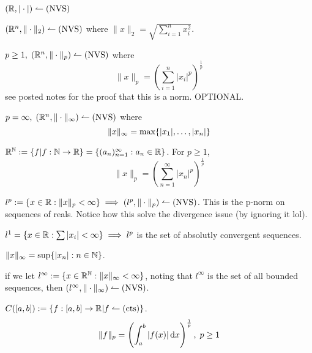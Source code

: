 \documentclass[12pt]{article}
\begin{document}
\bboxex
\begin{exam}\label{exam:absolute_value_norm}
  \((\mathbb R,|\cdot|)\leftharpoonup(\mathrm{NVS})\)
\end{exam}
\ebox


\bboxex
\begin{exam}\label{exam:euclidean_norm}
  \((\mathbb R^n,\|\cdot\|_2)\leftharpoonup(\mathrm{NVS})\) where \(\|x\|_2=\sqrt{\sum_{i=1}^n x_i^2}\).
\end{exam}
\ebox

\bboxex
\begin{exam}[P-Norm]\label{exam:p_norm}
  \(p\ge 1,\;(\mathbb R^n,\|\cdot\|_p)\leftharpoonup(\mathrm{NVS})\) where
  \[\|x\|_p=\left(\sum_{i=1}^n|x_i|^p\right)^\frac1p\]
  \bboxnote
   see posted notes for the proof that this is a norm. OPTIONAL.
  \ebox
\end{exam}
\ebox

\bboxex
\begin{exam}\label{exam:infinity_norm}
  \(p=\infty,\;(\mathbb R^n,\|\cdot\|_\infty)\leftharpoonup(\mathrm{NVS})\) where
  \[\|x\|_\infty=\mathrm{max}\{|x_1|,\dots,|x_n|\}\]
\end{exam}
\ebox

\bboxex
\begin{exam}\label{exam:p_norm_on_sequences_of_reals}
  \(\mathbb R^\mathbb N:=\{f|f:\mathbb N\to\mathbb R\}=\{(a_n)_{n=1}^\infty:a_n\in\mathbb R\}\). For \(p\ge 1\),
  \begin{equation}
    \|x\|_p=\left(\sum_{n=1}^\infty|x_n|^p\right)^{\frac1p}
  \end{equation}

  \(l^p:=\{x\in\mathbb R:\|x\|_p<\infty\}\implies(l^p,\|\cdot\|_p)\leftharpoonup(\mathrm{NVS})\). This
  is the p-norm on sequences of reals. Notice how this solve the divergence
  issue (by ignoring it lol).
\end{exam}
\ebox


\bboxex
{} \(l^1=\{x\in\mathbb R:\sum|x_i|<\infty\}\implies l^p\) is the set of
absolutly convergent sequences.
\ebox


\bboxex
\begin{exam}\label{exam:suprema_norm}
  \(\|x\|_\infty=\sup\{|x_n|:n\in\mathbb N\}\).

  if we let \(l^\infty:=\{x\in\mathbb R^\mathbb N:\|x\|_\infty<\infty\}\), noting that
  \(l^\infty\) is the set of all bounded sequences, then 
  \((l^\infty,\|\cdot\|_\infty)\leftharpoonup(\mathrm{NVS})\).
\end{exam}
\ebox

\bboxex
\begin{exam}\label{exam:p_norm_on_functions}
  \(C([a,b]):=\{f:[a,b]\to\mathbb R|f\leftharpoonup(\mathrm{cts})\}\).
  \[\|f\|_p=\left(\int_a^b|f(x)|\,\mathrm{d} x\right)^{\frac1p},\;p\ge 1\]
\end{exam}
\ebox
\end{document}
